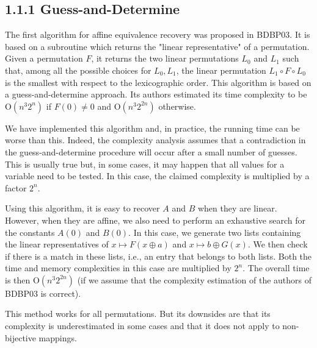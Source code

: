 \documentclass[10pt]{article}
\begin{document}
\subsection*{1.1.1 Guess-and-Determine}
The first algorithm for affine equivalence recovery was proposed in BDBP03. It is based on a subroutine which returns the "linear representative" of a permutation. Given a permutation $F$, it returns the two linear permutations $L_{0}$ and $L_{1}$ such that, among all the possible choices for $L_{0}, L_{1}$, the linear permutation $L_{1} \circ F \circ L_{0}$ is the smallest with respect to the lexicographic order. This algorithm is based on a guess-and-determine approach. Its authors estimated its time complexity to be $\mathrm{O}\left(n^{3} 2^{n}\right)$ if $F(0) \neq 0$ and $\mathrm{O}\left(n^{3} 2^{2 n}\right)$ otherwise.

We have implemented this algorithm and, in practice, the running time can be worse than this. Indeed, the complexity analysis assumes that a contradiction in the guess-and-determine procedure will occur after a small number of guesses. This is usually true but, in some cases, it may happen that all values for a variable need to be tested. In this case, the claimed complexity is multiplied by a factor $2^{n}$.

Using this algorithm, it is easy to recover $A$ and $B$ when they are linear. However, when they are affine, we also need to perform an exhaustive search for the constants $A(0)$ and $B(0)$. In this case, we generate two lists containing the linear representatives of $x \mapsto F(x \oplus a)$ and $x \mapsto b \oplus G(x)$. We then check if there is a match in these lists, i.e., an entry that belongs to both lists. Both the time and memory complexities in this case are multiplied by $2^{n}$. The overall time is then $\mathrm{O}\left(n^{3} 2^{2 n}\right)$ (if we assume that the complexity estimation of the authors of BDBP03 is correct).

This method works for all permutations. But its downsides are that its complexity is underestimated in some cases and that it does not apply to non-bijective mappings.
\end{document}
